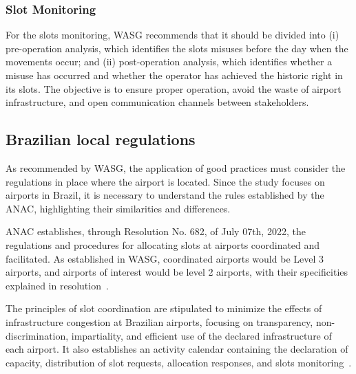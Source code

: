 \subsubsection{Slot Monitoring}

For the slots monitoring, \acrshort{WASG} recommends that it should be divided
into (i) pre-operation analysis, which identifies the slots misuses before the
day when the movements occur; and (ii) post-operation analysis, which identifies
whether a misuse has occurred and whether the operator has achieved the historic
right in its slots.
%
The objective is to ensure proper operation, avoid the waste of airport
infrastructure, and open communication channels between stakeholders.




\subsection{Brazilian local regulations}
\label{subsec:BraLocReg}



As recommended by \acrshort{WASG}, the application of good practices must
consider the regulations in place where the airport is located.
%
Since the study focuses on airports in Brazil, it is necessary to
understand the rules established by the \acrshort{ANAC}, highlighting their
similarities and differences.



\acrshort{ANAC} establishes, through Resolution No. 682, of July 07th, 2022, the
regulations and procedures for allocating slots at airports coordinated and
facilitated.
%
As established in \acrshort{WASG}, coordinated airports would be Level 3
airports, and airports of interest would be level 2 airports, with their
specificities explained in resolution~\cite{ANAC682}.



The principles of slot coordination are stipulated to minimize the effects of
infrastructure congestion at Brazilian airports, focusing on transparency,
non-discrimination, impartiality, and efficient use of the declared
infrastructure of each airport.
%
It also establishes an activity calendar containing the declaration of capacity,
distribution of slot requests, allocation responses, and slots
monitoring~\cite{ANAC682}.



